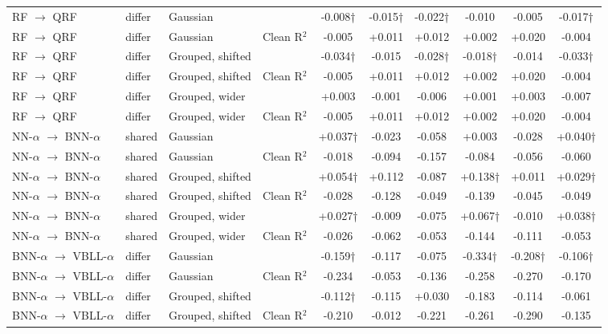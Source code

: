 \begin{landscape}
{\begin{longtable}{llllcccccc}
RF $\rightarrow$ QRF & differ & Gaussian & \aucnorm{} & -0.008† & -0.015† & -0.022† & -0.010 & -0.005 & -0.017† \\
RF $\rightarrow$ QRF & differ & Gaussian & Clean R$^2$ & -0.005 & +0.011 & +0.012 & +0.002 & +0.020 & -0.004 \\
RF $\rightarrow$ QRF & differ & Grouped, shifted & \aucnorm{} & -0.034† & -0.015 & -0.028† & -0.018† & -0.014 & -0.033† \\
RF $\rightarrow$ QRF & differ & Grouped, shifted & Clean R$^2$ & -0.005 & +0.011 & +0.012 & +0.002 & +0.020 & -0.004 \\
RF $\rightarrow$ QRF & differ & Grouped, wider & \aucnorm{} & +0.003 & -0.001 & -0.006 & +0.001 & +0.003 & -0.007 \\
RF $\rightarrow$ QRF & differ & Grouped, wider & Clean R$^2$ & -0.005 & +0.011 & +0.012 & +0.002 & +0.020 & -0.004 \\
NN-$\alpha$ $\rightarrow$ BNN-$\alpha$ & shared & Gaussian & \aucnorm{} & +0.037† & -0.023 & -0.058 & +0.003 & -0.028 & +0.040† \\
NN-$\alpha$ $\rightarrow$ BNN-$\alpha$ & shared & Gaussian & Clean R$^2$ & -0.018 & -0.094 & -0.157 & -0.084 & -0.056 & -0.060 \\
NN-$\alpha$ $\rightarrow$ BNN-$\alpha$ & shared & Grouped, shifted & \aucnorm{} & +0.054† & +0.112 & -0.087 & +0.138† & +0.011 & +0.029† \\
NN-$\alpha$ $\rightarrow$ BNN-$\alpha$ & shared & Grouped, shifted & Clean R$^2$ & -0.028 & -0.128 & -0.049 & -0.139 & -0.045 & -0.049 \\
NN-$\alpha$ $\rightarrow$ BNN-$\alpha$ & shared & Grouped, wider & \aucnorm{} & +0.027† & -0.009 & -0.075 & +0.067† & -0.010 & +0.038† \\
NN-$\alpha$ $\rightarrow$ BNN-$\alpha$ & shared & Grouped, wider & Clean R$^2$ & -0.026 & -0.062 & -0.053 & -0.144 & -0.111 & -0.053 \\
BNN-$\alpha$ $\rightarrow$ VBLL-$\alpha$ & differ & Gaussian & \aucnorm{} & -0.159† & -0.117 & -0.075 & -0.334† & -0.208† & -0.106† \\
BNN-$\alpha$ $\rightarrow$ VBLL-$\alpha$ & differ & Gaussian & Clean R$^2$ & -0.234 & -0.053 & -0.136 & -0.258 & -0.270 & -0.170 \\
BNN-$\alpha$ $\rightarrow$ VBLL-$\alpha$ & differ & Grouped, shifted & \aucnorm{} & -0.112† & -0.115 & +0.030 & -0.183 & -0.114 & -0.061 \\
BNN-$\alpha$ $\rightarrow$ VBLL-$\alpha$ & differ & Grouped, shifted & Clean R$^2$ & -0.210 & -0.012 & -0.221 & -0.261 & -0.290 & -0.135 \\

\end{longtable}}
\end{landscape}
